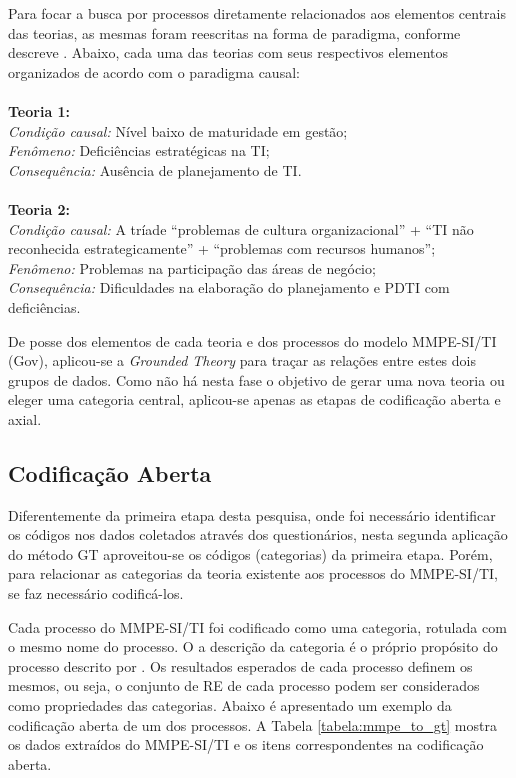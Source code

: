 Para focar a busca por processos diretamente relacionados aos elementos centrais das teorias, as mesmas foram reescritas na forma de paradigma, conforme descreve . Abaixo, cada uma das teorias com seus respectivos elementos organizados de acordo com o paradigma causal:
\\
\\
\textbf{Teoria 1:}\\
\textit{Condição causal:} Nível baixo de maturidade em gestão;\\
\textit{Fenômeno:} Deficiências estratégicas na TI;\\
\textit{Consequência:} Ausência de planejamento de TI.
\\
\\
\textbf{Teoria 2:}\\
\textit{Condição causal:} A tríade ``problemas de cultura organizacional'' + ``TI não reconhecida estrategicamente'' + ``problemas com recursos humanos'';\\
\textit{Fenômeno:} Problemas na participação das áreas de negócio;\\
\textit{Consequência:} Dificuldades na elaboração do planejamento e PDTI com deficiências.

De posse dos elementos de cada teoria e dos processos do modelo MMPE-SI/TI (Gov), aplicou-se a \textit{Grounded Theory} para traçar as relações entre estes dois grupos de dados. Como não há nesta fase o objetivo de gerar uma nova teoria ou eleger uma categoria central, aplicou-se apenas as etapas de codificação aberta e axial.

\subsection{Codificação Aberta}

Diferentemente da primeira etapa desta pesquisa, onde foi necessário identificar os códigos nos dados coletados através dos questionários, nesta segunda aplicação do método GT aproveitou-se os códigos (categorias) da primeira etapa. Porém, para relacionar as categorias da teoria existente aos processos do MMPE-SI/TI, se faz necessário codificá-los.

Cada processo do MMPE-SI/TI foi codificado como uma categoria, rotulada com o mesmo nome do processo. O a descrição da categoria é o próprio propósito do processo descrito por . Os resultados esperados de cada processo definem os mesmos, ou seja, o conjunto de RE de cada processo podem ser considerados como propriedades das categorias. Abaixo é apresentado um exemplo da codificação aberta de um dos processos. A Tabela \ref{tabela:mmpe_to_gt} mostra os dados extraídos do MMPE-SI/TI e os itens correspondentes na codificação aberta.

